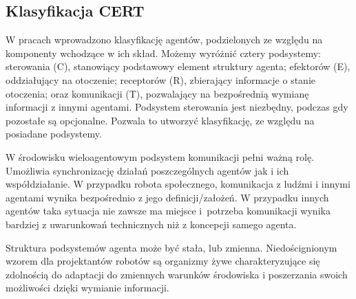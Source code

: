 \subsection{Klasyfikacja CERT}
\label{sec:agentCERT}

W pracach \cite{KORN, ZIEL} wprowadzono klasyfikację agentów, podzielonych ze względu na komponenty wchodzące w ich skład. %
Możemy wyróżnić cztery podsystemy: sterowania (C), stanowiący podstawowy element struktury agenta; efektorów (E), oddziałujący na otoczenie; receptorów (R), zbierający informacje o stanie otoczenia; oraz komunikacji (T), pozwalający na bezpośrednią wymianę informacji z innymi agentami. Podsystem sterowania jest niezbędny, podczas gdy pozostałe są opcjonalne. Pozwala to utworzyć klasyfikację, ze względu na posiadane podsystemy. %

W środowisku wieloagentowym podsystem komunikacji pełni ważną rolę. Umożliwia synchronizację działań poszczególnych agentów jak i ich współdziałanie. W przypadku robota społecznego, komunikacja z ludźmi i innymi agentami wynika bezpośrednio z jego definicji/założeń. W przypadku innych agentów taka sytuacja nie zawsze ma miejsce i~potrzeba komunikacji wynika bardziej z uwarunkowań technicznych niż z koncepcji samego agenta. 

Struktura podsystemów agenta może być stała, lub zmienna. Niedoścignionym wzorem dla projektantów robotów są organizmy żywe charakteryzujące się zdolnością do adaptacji do zmiennych warunków środowiska i poszerzania swoich możliwości dzięki wymianie informacji.

